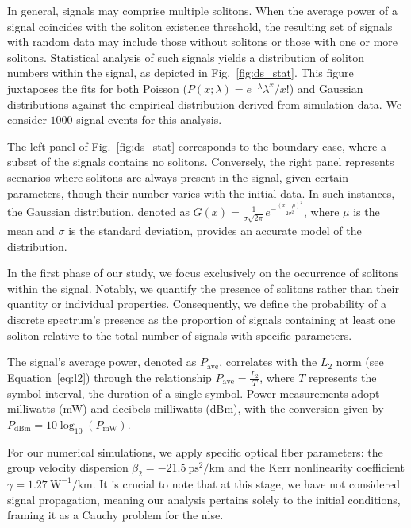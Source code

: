 In general, signals may comprise multiple solitons. When the average power of a signal coincides with the soliton existence threshold, the resulting set of signals with random data may include those without solitons or those with one or more solitons. Statistical analysis of such signals yields a distribution of soliton numbers within the signal, as depicted in Fig.~\ref{fig:ds_stat}. This figure juxtaposes the fits for both Poisson ($P(x;\lambda) = e^{-\lambda} \lambda^x / x!$) and Gaussian distributions against the empirical distribution derived from simulation data. We consider $1000$ signal events for this analysis.

The left panel of Fig.~\ref{fig:ds_stat} corresponds to the boundary case, where a subset of the signals contains no solitons. Conversely, the right panel represents scenarios where solitons are always present in the signal, given certain parameters, though their number varies with the initial data. In such instances, the Gaussian distribution, denoted as $G(x) = \frac{1}{\sigma \sqrt{2 \pi}} e^{-\frac{(x-\mu)^2}{2\sigma^2}}$, where $\mu$ is the mean and $\sigma$ is the standard deviation, provides an accurate model of the distribution.


In the first phase of our study, we focus exclusively on the occurrence of solitons within the signal. Notably, we quantify the presence of solitons rather than their quantity or individual properties. Consequently, we define the probability of a discrete spectrum's presence as the proportion of signals containing at least one soliton relative to the total number of signals with specific parameters.

The signal's average power, denoted as \( P_{\text{ave}} \), correlates with the \( L_2 \) norm (see Equation~\ref{eq:l2}) through the relationship \( P_{\text{ave}} = \frac{L_2}{T} \), where \( T \) represents the symbol interval, the duration of a single symbol. Power measurements adopt milliwatts (mW) and decibels-milliwatts (dBm), with the conversion given by \( P_{\text{dBm}} = 10 \log_{10}(P_{\text{mW}}) \).

For our numerical simulations, we apply specific optical fiber parameters: the group velocity dispersion \( \beta_2 = -21.5 \ \text{ps}^2/\text{km} \) and the Kerr nonlinearity coefficient \( \gamma = 1.27 \ \text{W}^{-1}/\text{km} \). It is crucial to note that at this stage, we have not considered signal propagation, meaning our analysis pertains solely to the initial conditions, framing it as a Cauchy problem for the \gls{nlse}.



